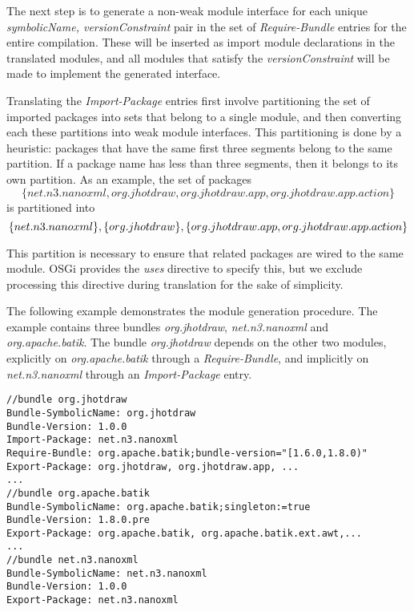 The next step is to generate a non-weak module interface for each unique \textit{symbolicName, versionConstraint}
pair in the set of \textit{Require-Bundle} entries for the entire compilation. These will be inserted 
as import module declarations in the translated modules, and all modules that satisfy the \textit{versionConstraint}
will be made to implement the generated interface.

Translating the \textit{Import-Package} entries first involve partitioning the set of imported 
packages into sets that belong to a single module, and then converting each these partitions into
weak module interfaces. This partitioning is done by a heuristic: packages that have the same first
three segments belong to the same partition. If a package name has less than three segments, then
it belongs to its own partition. As an example, the set of packages\\
\[
\{net.n3.nanoxml, org.jhotdraw, org.jhotdraw.app, org.jhotdraw.app.action\}
\]
is partitioned into\\
\[\{net.n3.nanoxml\}, \{org.jhotdraw\}, \\ \{org.jhotdraw.app, org.jhotdraw.app.action\}\]

This partition is necessary to ensure that related packages are wired to the same module. OSGi provides
the \textit{uses} directive to specify this, but we exclude processing this directive during translation 
for the sake of simplicity.

The following example demonstrates the module generation procedure. The example contains three bundles
\textit{org.jhotdraw}, \textit{net.n3.nanoxml} and \textit{org.apache.batik}. The bundle \textit{org.jhotdraw}
depends on the other two modules, explicitly on \textit{org.apache.batik} through a \textit{Require-Bundle}, 
and implicitly on \textit{net.n3.nanoxml} through an \textit{Import-Package} entry.

\begin{lstlisting}[caption=Bundle Translation Example]
//bundle org.jhotdraw
Bundle-SymbolicName: org.jhotdraw
Bundle-Version: 1.0.0
Import-Package: net.n3.nanoxml
Require-Bundle: org.apache.batik;bundle-version="[1.6.0,1.8.0)"
Export-Package: org.jhotdraw, org.jhotdraw.app, ...
...
//bundle org.apache.batik
Bundle-SymbolicName: org.apache.batik;singleton:=true
Bundle-Version: 1.8.0.pre
Export-Package: org.apache.batik, org.apache.batik.ext.awt,...
...
//bundle net.n3.nanoxml
Bundle-SymbolicName: net.n3.nanoxml
Bundle-Version: 1.0.0
Export-Package: net.n3.nanoxml
\end{lstlisting}

